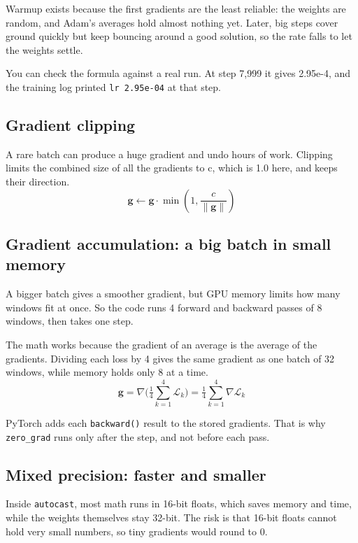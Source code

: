 \documentclass[11pt,a4paper]{article}
\newcommand{\code}[1]{\texttt{#1}}
\begin{document}
Warmup exists because the first gradients are the least reliable: the weights are random, and Adam's averages hold almost nothing yet. Later, big steps cover ground quickly but keep bouncing around a good solution, so the rate falls to let the weights settle.

You can check the formula against a real run. At step 7,999 it gives 2.95e-4, and the training log printed \code{lr 2.\allowbreak{}95e-04} at that step.

\subsection*{Gradient clipping}
{}

A rare batch can produce a huge gradient and undo hours of work. Clipping limits the combined size of all the gradients to c, which is 1.0 here, and keeps their direction.
\[
\mathbf{g}\leftarrow\mathbf{g}\cdot\min\!\left(1,\frac{c}{\lVert\mathbf{g}\rVert}\right)
\]

\subsection*{Gradient accumulation: a big batch in small memory}
{}

A bigger batch gives a smoother gradient, but GPU memory limits how many windows fit at once. So the code runs 4 forward and backward passes of 8 windows, then takes one step.

The math works because the gradient of an average is the average of the gradients. Dividing each loss by 4 gives the same gradient as one batch of 32 windows, while memory holds only 8 at a time.
\[
\mathbf{g}=\nabla\Big(\tfrac14\sum_{k=1}^{4}\mathcal{L}_k\Big)=\tfrac14\sum_{k=1}^{4}\nabla\mathcal{L}_k
\]

PyTorch adds each \code{backward()} result to the stored gradients. That is why \code{zero\_\allowbreak{}grad} runs only after the step, and not before each pass.

\subsection*{Mixed precision: faster and smaller}
{}

Inside \code{autocast}, most math runs in 16-bit floats, which saves memory and time, while the weights themselves stay 32-bit. The risk is that 16-bit floats cannot hold very small numbers, so tiny gradients would round to 0.
\end{document}
